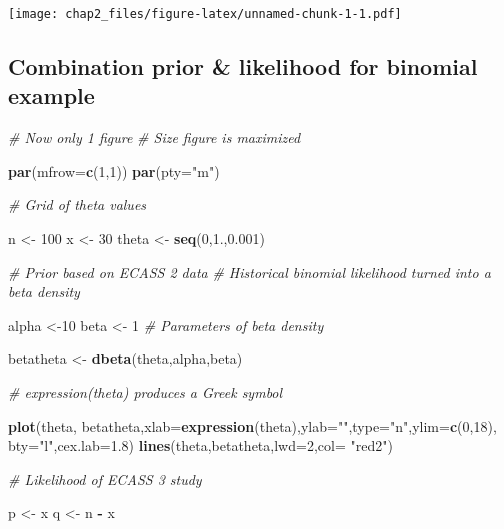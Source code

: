 \documentclass[
]{article}
\newenvironment{Shaded}{\begin{snugshade}}{\end{snugshade}}
\newcommand{\CommentTok}[1]{\textcolor[rgb]{0.56,0.35,0.01}{\textit{#1}}}
\newcommand{\DataTypeTok}[1]{\textcolor[rgb]{0.13,0.29,0.53}{#1}}
\newcommand{\DecValTok}[1]{\textcolor[rgb]{0.00,0.00,0.81}{#1}}
\newcommand{\FloatTok}[1]{\textcolor[rgb]{0.00,0.00,0.81}{#1}}
\newcommand{\KeywordTok}[1]{\textcolor[rgb]{0.13,0.29,0.53}{\textbf{#1}}}
\newcommand{\NormalTok}[1]{#1}
\newcommand{\OperatorTok}[1]{\textcolor[rgb]{0.81,0.36,0.00}{\textbf{#1}}}
\newcommand{\StringTok}[1]{\textcolor[rgb]{0.31,0.60,0.02}{#1}}
\begin{document}
\texttt{[image: chap2\_files/figure-latex/unnamed-chunk-1-1.pdf]}

\hypertarget{combination-prior-likelihood-for-binomial-example}{%
\subsection{Combination prior \& likelihood for binomial
example}\label{combination-prior-likelihood-for-binomial-example}}

\begin{Shaded}
\begin{Highlighting}[]
\CommentTok{# Now only 1 figure}
\CommentTok{# Size figure is maximized}

\KeywordTok{par}\NormalTok{(}\DataTypeTok{mfrow=}\KeywordTok{c}\NormalTok{(}\DecValTok{1}\NormalTok{,}\DecValTok{1}\NormalTok{))}
\KeywordTok{par}\NormalTok{(}\DataTypeTok{pty=}\StringTok{"m"}\NormalTok{)}

\CommentTok{# Grid of theta values}

\NormalTok{n <-}\StringTok{ }\DecValTok{100}
\NormalTok{x <-}\StringTok{ }\DecValTok{30}
\NormalTok{theta <-}\StringTok{ }\KeywordTok{seq}\NormalTok{(}\DecValTok{0}\NormalTok{,}\FloatTok{1.}\NormalTok{,}\FloatTok{0.001}\NormalTok{)}

\CommentTok{# Prior based on ECASS 2 data}
\CommentTok{# Historical binomial likelihood turned into a beta density}

\NormalTok{alpha <-}\DecValTok{10}
\NormalTok{beta <-}\StringTok{ }\DecValTok{1}
\CommentTok{# Parameters of beta density}

\NormalTok{betatheta <-}\StringTok{ }\KeywordTok{dbeta}\NormalTok{(theta,alpha,beta)}

\CommentTok{# expression(theta) produces a Greek symbol}

\KeywordTok{plot}\NormalTok{(theta, betatheta,}\DataTypeTok{xlab=}\KeywordTok{expression}\NormalTok{(theta),}\DataTypeTok{ylab=}\StringTok{""}\NormalTok{,}\DataTypeTok{type=}\StringTok{"n"}\NormalTok{,}\DataTypeTok{ylim=}\KeywordTok{c}\NormalTok{(}\DecValTok{0}\NormalTok{,}\DecValTok{18}\NormalTok{),}
     \DataTypeTok{bty=}\StringTok{"l"}\NormalTok{,}\DataTypeTok{cex.lab=}\FloatTok{1.8}\NormalTok{)}
\KeywordTok{lines}\NormalTok{(theta,betatheta,}\DataTypeTok{lwd=}\DecValTok{2}\NormalTok{,}\DataTypeTok{col=} \StringTok{"red2"}\NormalTok{)}

\CommentTok{# Likelihood of ECASS 3 study}

\NormalTok{p <-}\StringTok{ }\NormalTok{x }
\NormalTok{q <-}\StringTok{ }\NormalTok{n }\OperatorTok{-}\StringTok{ }\NormalTok{x}


\end{Highlighting}
\end{Shaded}
\end{document}
